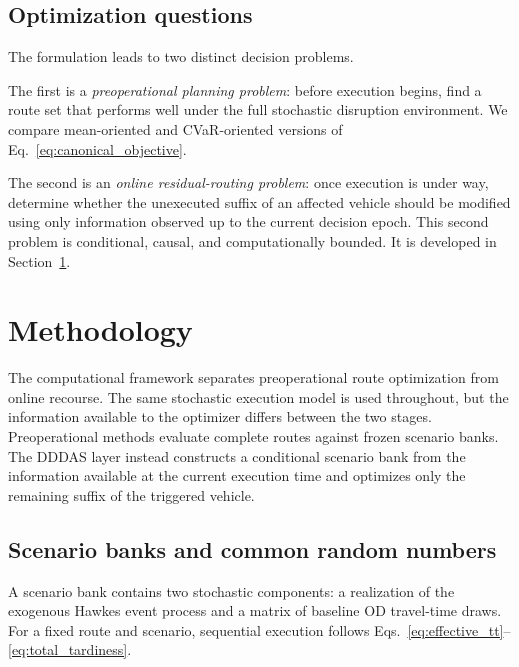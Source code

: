 \documentclass[preprint,12pt]{elsarticle}
\newcommand{\1}{\mathbf{1}}
\begin{document}
\subsection{Optimization questions}

The formulation leads to two distinct decision problems.

The first is a \emph{preoperational planning problem}: before execution begins,
find a route set that performs well under the full stochastic disruption
environment. We compare mean-oriented and CVaR-oriented versions of
Eq.~\eqref{eq:canonical_objective}.

The second is an \emph{online residual-routing problem}: once execution is under
way, determine whether the unexecuted suffix of an affected vehicle should be
modified using only information observed up to the current decision epoch.
This second problem is conditional, causal, and computationally bounded.
It is developed in Section~\ref{sec:methods}.


\section{Methodology}
\label{sec:methods}

The computational framework separates preoperational route optimization from
online recourse. The same stochastic execution model is used throughout, but
the information available to the optimizer differs between the two stages.
Preoperational methods evaluate complete routes against frozen scenario banks.
The DDDAS layer instead constructs a conditional scenario bank from the
information available at the current execution time and optimizes only the
remaining suffix of the triggered vehicle.

\subsection{Scenario banks and common random numbers}
\label{subsec:scenario_banks}

A scenario bank contains two stochastic components: a realization of the
exogenous Hawkes event process and a matrix of baseline OD travel-time draws.
For a fixed route and scenario, sequential execution follows
Eqs.~\eqref{eq:effective_tt}--\eqref{eq:total_tardiness}.
\end{document}
